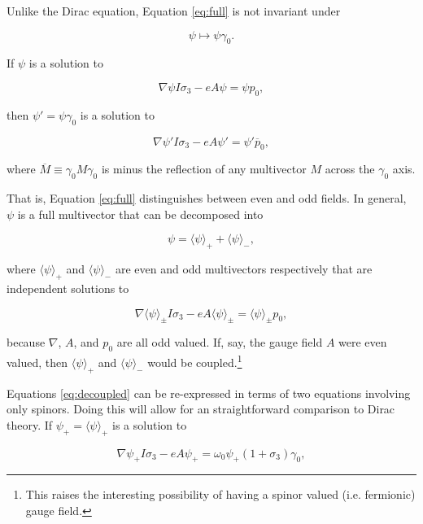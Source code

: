 \documentclass{article}
\begin{document}
  Unlike the Dirac equation, Equation \ref{eq:full} is not invariant under

  \begin{equation}
    \psi \mapsto \psi \gamma_0.\label{eq:g0conjugation}
  \end{equation}

  If $\psi$ is a solution to

  \begin{equation}
    \nabla \psi I \sigma_3 - e A \psi = \psi p_0,\label{eq:plus}
  \end{equation}

  then $\psi' = \psi \gamma_0$ is a solution to

  \begin{equation}
    \nabla \psi' I \sigma_3 - e A \psi' = \psi' \overline p_0, \label{eq:minus}
  \end{equation}

  where $\overline M \equiv \gamma_0 M\gamma_0$ is minus the reflection of any multivector $M$ across the $\gamma_0$ axis.

  That is, Equation \ref{eq:full} distinguishes between even and odd fields. In general, $\psi$ is a full multivector that can be decomposed into

  \begin{equation}
    \psi = \langle \psi \rangle_+ + \langle \psi \rangle_-,
  \end{equation}

  where $\langle \psi \rangle_+$ and $\langle \psi \rangle_-$ are even and odd multivectors respectively that are independent solutions to

  \begin{equation}
    \nabla \langle \psi \rangle_\pm I \sigma_3 - e A \langle \psi \rangle_\pm = \langle \psi \rangle_\pm p_0,\label{eq:decoupled}
  \end{equation}

  because $\nabla$, $A$, and $p_0$ are all odd valued. If, say, the gauge field $A$ were even valued, then $\langle \psi \rangle_+$ and $\langle \psi \rangle_-$ would be coupled.\footnote{This raises the interesting possibility of having a spinor valued (i.e. fermionic) gauge field.}

  Equations \ref{eq:decoupled} can be re-expressed in terms of two equations involving only spinors. Doing this will allow for an straightforward comparison to Dirac theory. If $\psi_+ = \langle \psi \rangle_+$ is a solution to

  \begin{equation}
    \nabla \psi_+ I \sigma_3 - e A \psi_+ = \omega_0 \psi_+ (1 + \sigma_3) \gamma_0,\label{eq:even}
  \end{equation}
\end{document}
